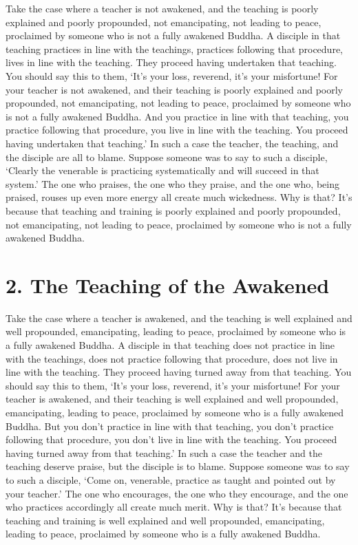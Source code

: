 \documentclass[12pt,openany]{book}%
\begin{document}
Take the case where a teacher is not awakened, and the teaching is poorly explained and poorly propounded, not emancipating, not leading to peace, proclaimed by someone who is not a fully awakened Buddha. A disciple in that teaching practices in line with the teachings, practices following that procedure, lives in line with the teaching. They proceed having undertaken that teaching. You should say this to them, ‘It’s your loss, reverend, it’s your misfortune! For your teacher is not awakened, and their teaching is poorly explained and poorly propounded, not emancipating, not leading to peace, proclaimed by someone who is not a fully awakened Buddha. And you practice in line with that teaching, you practice following that procedure, you live in line with the teaching. You proceed having undertaken that teaching.’ In such a case the teacher, the teaching, and the disciple are all to blame. Suppose someone was to say to such a disciple, ‘Clearly the venerable is practicing systematically and will succeed in that system.’ The one who praises, the one who they praise, and the one who, being praised, rouses up even more energy all create much wickedness. Why is that? It’s because that teaching and training is poorly explained and poorly propounded, not emancipating, not leading to peace, proclaimed by someone who is not a fully awakened Buddha. 

\section*{2. The Teaching of the Awakened }

Take the case where a teacher is awakened, and the teaching is well explained and well propounded, emancipating, leading to peace, proclaimed by someone who is a fully awakened Buddha. A disciple in that teaching does not practice in line with the teachings, does not practice following that procedure, does not live in line with the teaching. They proceed having turned away from that teaching. You should say this to them, ‘It’s your loss, reverend, it’s your misfortune! For your teacher is awakened, and their teaching is well explained and well propounded, emancipating, leading to peace, proclaimed by someone who is a fully awakened Buddha. But you don’t practice in line with that teaching, you don’t practice following that procedure, you don’t live in line with the teaching. You proceed having turned away from that teaching.’ In such a case the teacher and the teaching deserve praise, but the disciple is to blame. Suppose someone was to say to such a disciple, ‘Come on, venerable, practice as taught and pointed out by your teacher.’ The one who encourages, the one who they encourage, and the one who practices accordingly all create much merit. Why is that? It’s because that teaching and training is well explained and well propounded, emancipating, leading to peace, proclaimed by someone who is a fully awakened Buddha. 
\end{document}
